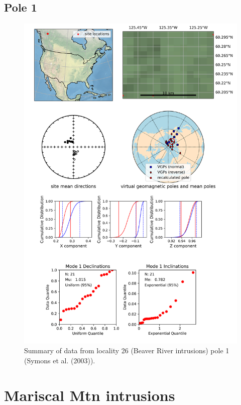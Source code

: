 \subsection{Pole 1}


\begin{figure}[H]
\centering
\includegraphics[width=5 in]{./26/1/pole_summary.png}
\caption{Summary of data from locality 26 (Beaver River intrusions) pole 1 (Symons et al. (2003)).}
\end{figure}

\section{Mariscal Mtn intrusions}
